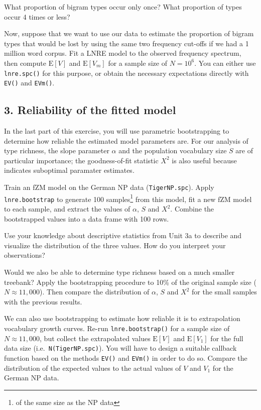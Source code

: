 \documentclass[a4paper,12pt]{article}
\begin{document}
What proportion of bigram types occur only once? What proportion of types
occur 4 times or less?

Now, suppose that we want to use our data to estimate the proportion
of bigram types that would be lost by using the same two frequency
cut-offs if we had a 1 million word corpus.  
Fit a LNRE model to the observed frequency spectrum, then compute $\mathrm{E}[V]$ and $\mathrm{E}[V_m]$
for a sample size of $N = 10^6$.  You can either use \texttt{lnre.spc()} for this purpose, or obtain the
necessary expectations directly with \texttt{EV()} and \texttt{EVm()}.


\subsection*{3. Reliability of the fitted model}

In the last part of this exercise, you will use parametric bootstrapping to determine how reliable the estimated model parameters are. For our analysis of type richness, the slope parameter $\alpha$ and the population vocabulary size $S$ are of particular importance; the goodness-of-fit statistic $X^2$ is also useful because indicates suboptimal paramater estimates.

Train an fZM model on the German NP data (\texttt{TigerNP.spc}).  Apply \texttt{lnre.bootstrap} to generate 100 samples\footnote{of the same size as the NP data} from this model, fit a new fZM model to each sample, and extract the values of $\alpha$, $S$ and $X^2$.  Combine the bootstrapped values into a data frame with 100 rows.

Use your knowledge about descriptive statistics from Unit 3a to describe and visualize the distribution of the three values.  How do you interpret your observations?

Would we also be able to determine type richness based on a much smaller treebank?   Apply the bootstrapping procedure to 10\% of the original sample size ($N \approx 11{,}000$).  Then compare the distribution of $\alpha$, $S$ and $X^2$ for the small samples with the previous results.

We can also use bootstrapping to estimate how reliable it is to extrapolation vocabulary growth curves.  Re-run \texttt{lnre.bootstrap()} for a sample size of $N \approx 11{,}000$, but collect the extrapolated values $\mathrm{E}[V]$ and $\mathrm{E}[V_1]$ for the full data size (i.e.\ \texttt{N(TigerNP.spc)}).  You will have to design a suitable callback function based on the methods \texttt{EV()} and \texttt{EVm()} in order to do so.  Compare the distribution of the expected values to the actual values of $V$ and $V_1$ for the German NP data.
\end{document}
